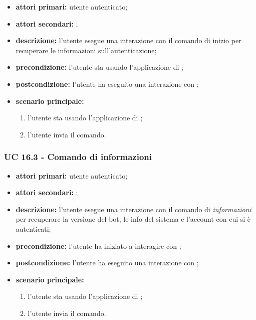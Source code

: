 	\begin{itemize}
		\item \textbf{attori primari:} utente autenticato;
		\item \textbf{attori secondari:} ;
		\item \textbf{descrizione:} l'utente esegue una interazione con il comando di inizio per recuperare le informazioni sull'autenticazione;
		\item \textbf{precondizione:} l'utente sta usando l'applicazione di ;
		\item \textbf{postcondizione:} l'utente ha eseguito una interazione con ;
		\item \textbf{scenario principale:}
		\begin{enumerate}
			\item l'utente sta usando l'applicazione di ;
			\item l'utente invia il comando.
		\end{enumerate}
	\end{itemize}


	\subsubsection{UC 16.3 - Comando di informazioni}

	\begin{itemize}
		\item \textbf{attori primari:} utente autenticato;
		\item \textbf{attori secondari:} ;
		\item \textbf{descrizione:} l'utente esegue una interazione con il comando di \textit{informazioni} per recuperare la versione del bot, le info del sistema e l'account con cui si è autenticati;
		\item \textbf{precondizione:} l'utente ha iniziato a interagire con ;
		\item \textbf{postcondizione:} l'utente ha eseguito una interazione con ;
		\item \textbf{scenario principale:}
		\begin{enumerate}
			\item l'utente sta usando l'applicazione di ;
			\item l'utente invia il comando.
		\end{enumerate}
	\end{itemize}



